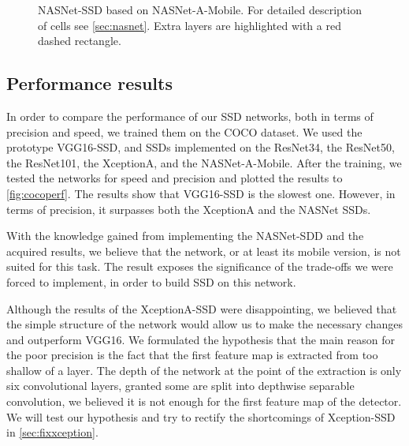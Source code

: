 \begin{figure}
    \centering
    \nasnetSSD
    \caption[NASNet-SSD]%
    {NASNet-SSD based on NASNet-A-Mobile. For detailed description of cells see \cref{sec:nasnet}. Extra layers are highlighted with a red dashed rectangle.}
    \label{fig:nasnetSSD}
\end{figure}

\subsection{Performance results} In order to compare the performance of our SSD networks, both in terms of precision and speed, we trained them on the COCO dataset. We used the prototype VGG16-SSD, and SSDs implemented on the ResNet34, the ResNet50, the ResNet101, the XceptionA, and the NASNet-A-Mobile. After the training, we tested the networks for speed and precision and plotted the results to \cref{fig:cocoperf}. The results show that VGG16-SSD is the slowest one. However, in terms of precision, it surpasses both the XceptionA and the NASNet SSDs.

With the knowledge gained from implementing the NASNet-SDD and the acquired results, we believe that the network, or at least its mobile version, is not suited for this task. The result exposes the significance of the trade-offs we were forced to implement, in order to build SSD on this network.

Although the results of the XceptionA-SSD were disappointing, we believed that the simple structure of the network would allow us to make the necessary changes and outperform VGG16. We formulated the hypothesis that the main reason for the poor precision is the fact that the first feature map is extracted from too shallow of a layer. The depth of the network at the point of the extraction is only six convolutional layers, granted some are split into depthwise separable convolution, we believed it is not enough for the first feature map of the detector. We will test our hypothesis and try to rectify the shortcomings of Xception-SSD in \cref{sec:fixxception}.


